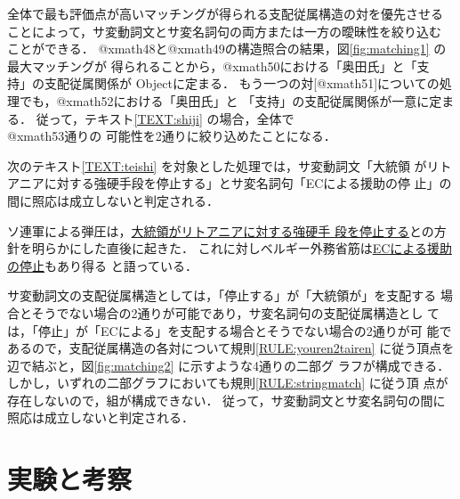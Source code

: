 全体で最も評価点が高いマッチングが得られる支配従属構造の対を優先させる
ことによって，サ変動詞文とサ変名詞句の両方または一方の曖昧性を絞り込む
ことができる．
@xmath48と@xmath49の構造照合の結果，\hspace*{0.2mm}図\ref{fig:matching1} の最\hspace*{0.2mm}大\hspace*{0.2mm}マ\hspace*{0.2mm}ッ\hspace*{0.2mm}チ\hspace*{0.2mm}ン\hspace*{0.2mm}グ\hspace*{0.2mm}が
得\hspace*{0.2mm}ら\hspace*{0.2mm}れ\hspace*{0.2mm}ることから，\hspace*{0.2mm}@xmath50における「奥\hspace*{0.2mm}田\hspace*{0.2mm}氏」と「支\\持」の支配従属関係が
Objectに定まる．
もう一つの対[@xmath51]についての処理でも，@xmath52における「奥田氏」と
「支持」の支配従属関係が一意に定まる．
従って，テキスト\ref{TEXT:shiji} の場合，全体で\\@xmath53通りの
可能性を2通りに絞り込めたことになる．

次のテキスト\ref{TEXT:teishi} を対象とした処理では，サ変動詞文「大統領
がリトアニアに対する強硬手段を停止する」とサ変名詞句「ECによる援助の停
止」の間に照応は成立しないと判定される．
\begin{TEXT}
\text ソ連軍による弾圧は，\underline{大統領がリトアニアに対する強硬手
段を停止する}との方針を明らかにした直後に起きた．
これに対しベルギー外務省筋は\underline{ECによる援助の停止}もあり得る
と語っている．\label{TEXT:teishi}
\end{TEXT}
サ変動詞文の支配従属構造としては，「停止する」が「大統領が」を支配する
場合とそうでない場合の2通りが可能であり，サ変名詞句の支配従属構造とし
ては，「停止」が「ECによる」を支配する場合とそうでない場合の2通りが可
能であるので，支配従属構造の各対について規則\ref{RULE:youren2tairen}
に従う頂点を辺で結ぶと，図\ref{fig:matching2} に示すような4通りの二部グ
ラフが構成できる．
しかし，いずれの二部グラフにおいても規則\ref{RULE:stringmatch} に従う頂
点が存在しないので，組が構成できない． 
従って，サ変動詞文とサ変名詞句の間に照応は成立しないと判定される．


\section{実験と考察}
\label{sec:experiment}

